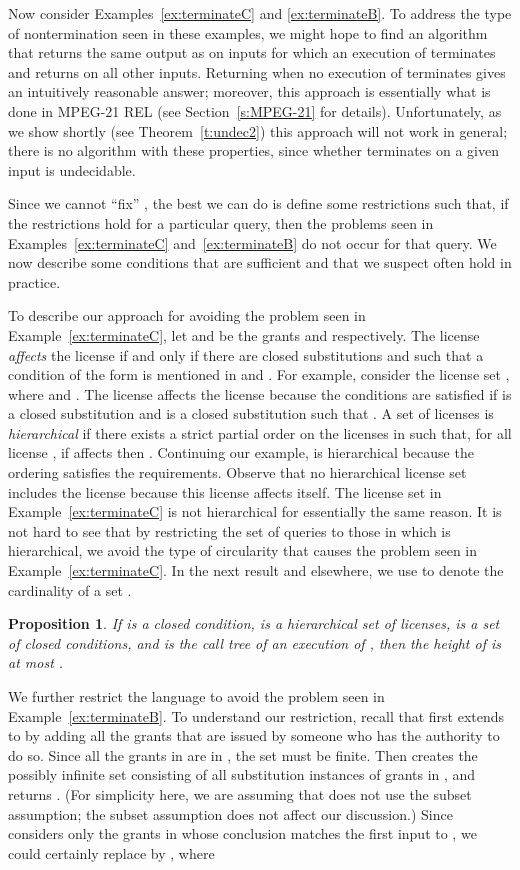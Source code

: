 \documentclass{acmtrans2m}
\newtheorem{proposition}[theorem]{Proposition}
\newcommand{\pro}{\begin{proposition}}
\newcommand{\epro}{\end{proposition}}
\newcommand{\<}{
}
\renewcommand{\>}{\rangle}
\begin{document}
Now consider Examples~\ref{ex:terminateC} and \ref{ex:terminateB}.  To address the type of
nontermination seen in these examples, we might hope to find an algorithm  that
returns the same output as  on inputs for which an execution of 
terminates and returns  on all other inputs.  Returning  when no execution
of  terminates gives an intuitively reasonable answer; moreover, this approach
is essentially what is done in MPEG-21 REL (see Section~\ref{s:MPEG-21} for details).
Unfortunately, as we show shortly (see Theorem~\ref{t:undec2}) this approach will not work
in general; there is no algorithm  with these properties, since whether
 terminates on a given input is undecidable.

Since we cannot ``fix'' , the best we can do is define some restrictions such
that, if the restrictions hold for a particular query, then the problems seen in
Examples~\ref{ex:terminateC} and~\ref{ex:terminateB} do not occur for that query.  We now
describe some conditions that are sufficient and that we suspect often hold in practice.

To describe our approach for avoiding the problem seen in Example~\ref{ex:terminateC}, let
 and  be the grants  and
 respectively.  The license 
\emph{affects} the license  if and only if there are closed substitutions 
and  such that a condition of the form  is mentioned in
 and .  For example, consider the license set
, where 
and .  The
license  affects the license  because the conditions
are satisfied if  is a closed substitution and  is a closed substitution such
that .  A set  of licenses is \emph{hierarchical} if there exists
a strict partial order  on the licenses in  such that, for all license
, if  affects  then .  Continuing our example,
 is hierarchical because the ordering 
satisfies the requirements.  Observe that no hierarchical license set includes the license
 because this license affects itself.  The
license set in Example~\ref{ex:terminateC} is not hierarchical for essentially the same reason.
It is not hard to see that by restricting the set of queries  to those in
which  is hierarchical, we avoid the type of circularity that causes the problem seen in
Example~\ref{ex:terminateC}.  In the next result and elsewhere, we use  to denote the
cardinality of a set .

\pro\label{p:fixExB}
If  is a closed condition,  is a hierarchical set of licenses,  is a set of closed
 conditions, and  is the call tree of an execution of , then the
height of  is at most .
\epro

We further restrict the language to avoid the problem seen in Example~\ref{ex:terminateB}.
To understand our restriction, recall that  first extends  to  by
adding all the grants that are issued by someone who has the authority to do so.  Since
all the grants in  are in , the set  must be finite.  Then  creates the
possibly infinite set  consisting of all substitution instances of grants in
, and returns .  (For simplicity here, we
are assuming that  does not use the subset assumption; the subset assumption does
not affect our discussion.)  Since  considers only the grants in  whose
conclusion matches the first input to , we could certainly replace  by
, where
\end{document}
